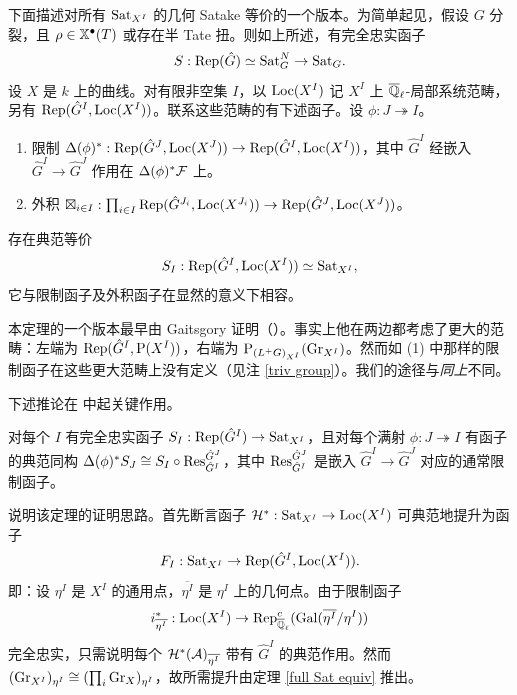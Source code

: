 下面描述对所有 ${\operatorname{Sat}}_{X^I}$ 的几何 Satake 等价的一个版本。为简单起见，假设 $G$ 分裂，且 $\rho\in \mathbb{X}^\bullet(T)$ 或存在半 Tate 扭。则如上所述，有完全忠实函子
\[S: \operatorname{Rep}(\hat G)\simeq {\operatorname{Sat}}_G^N\to {\operatorname{Sat}}_G.\]
设 $X$ 是 $k$ 上的曲线。对有限非空集 $I$，以 $\operatorname{Loc}(X^I)$ 记 $X^I$ 上 ${\overline{{\mathbb Q}}_\ell}$-局部系统范畴，另有 $\operatorname{Rep}(\hat G^I,\operatorname{Loc}(X^I))$。联系这些范畴的有下述函子。设 $\phi:J\twoheadrightarrow I$。
\begin{enumerate}
\item[(i)] 限制 $\Delta(\phi)^*: \operatorname{Rep}(\hat G^J,{\operatorname{Loc}(X^J)})\to \operatorname{Rep}(\hat G^I, {\operatorname{Loc}(X^I)})$，其中 $\hat G^I$ 经嵌入 $\hat G^I\to \hat G^J$ 作用在 $\Delta(\phi)^*{\mathcal F}$ 上。
\item[(ii)] 外积 $\boxtimes_{i\in I}:\prod_{i\in I} \operatorname{Rep}(\hat G^{J_i},{\operatorname{Loc}(X^{J_i})})\to \operatorname{Rep}(\hat G^J,\operatorname{Loc}(X^J))$。
\end{enumerate}

\begin{thm}\label{multiple point Sat}
存在典范等价
\[S_I: \operatorname{Rep}(\hat G^I, \operatorname{Loc}(X^I))\simeq {\operatorname{Sat}}_{X^I},\]
它与限制函子及外积函子在显然的意义下相容。
\end{thm}

\begin{rmk}
本定理的一个版本最早由 Gaitsgory 证明（\cite{Ga2}）。事实上他在两边都考虑了更大的范畴：左端为 $\operatorname{Rep}(\hat G^I, \operatorname{P}(X^I))$，右端为 $\operatorname{P}_{(L^+G)_{X^I}}({\operatorname{Gr}}_{X^I})$。然而如 (1) 中那样的限制函子在这些更大范畴上没有定义（见注 \ref{triv group}）。我们的途径与\emph{同上}不同。
\end{rmk}

下述推论在 \cite{Laf} 中起关键作用。

\begin{cor}
对每个 $I$ 有完全忠实函子 $S_I: \operatorname{Rep}(\hat G^I)\to {\operatorname{Sat}}_{X^I}$，且对每个满射 $\phi: J\twoheadrightarrow I$ 有函子的典范同构 $\Delta(\phi)^*S_J\cong S_I\circ {\operatorname{Res}}_{\hat G^I}^{\hat G^J}$，其中 ${\operatorname{Res}}_{\hat G^I}^{\hat G^J}$ 是嵌入 $\hat G^I\to \hat G^J$ 对应的通常限制函子。
\end{cor}

说明该定理的证明思路。首先断言函子 ${\mathcal H}^* :{\operatorname{Sat}}_{X^I}\to \operatorname{Loc}(X^I)$ 可典范地提升为函子
\[F_I: {\operatorname{Sat}}_{X^I}\to \operatorname{Rep}(\hat G^I,{\operatorname{Loc}(X^I)}).\]
即：设 $\eta^I$ 是 $X^I$ 的通用点，$\overline{\eta^I}$ 是 $\eta^I$ 上的几何点。由于限制函子
\[i_{\overline{\eta^I}}^*: \operatorname{Loc}(X^I)\to \operatorname{Rep}^c_{{\overline{{\mathbb Q}}_\ell}}({\operatorname{Gal}}(\overline{\eta^I}/\eta^I))\]
完全忠实，只需说明每个 ${\mathcal H}^*({\mathcal A})_{\overline{\eta^I}}$ 带有 $\hat G^I$ 的典范作用。然而 $({\operatorname{Gr}}_{X^I})_{\eta^I}\cong (\prod_i {\operatorname{Gr}}_X)_{\eta^I}$，故所需提升由定理 \ref{full Sat equiv} 推出。

